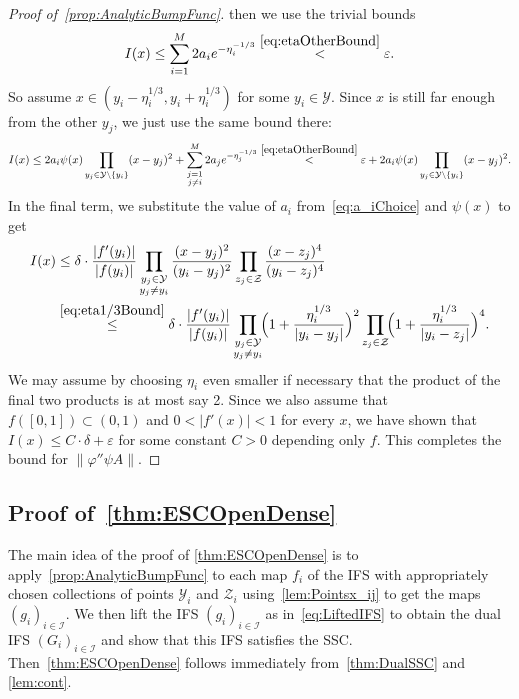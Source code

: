 \documentclass[11pt,]{article}
\def\cref#1{\ref{#1}}%
\theoremstyle{definition}
\theoremstyle{remark}
\newcommand{\0}{\mathbf{0}}
\begin{document}
\begin{proof}[Proof of~\cref{prop:AnalyticBumpFunc}]
then we use the trivial bounds
\begin{equation*}
	I(x) \leq \sum_{i=1}^{M} 2a_ie^{-\eta_i^{-1/3}} \stackrel{\eqref{eq:etaOtherBound}}{<} \varepsilon.
\end{equation*}
So assume $x\in(y_i-\eta_i^{1/3}, y_i+\eta_i^{1/3})$ for some $y_i\in\mathcal{Y}$. Since $x$ is
still far enough from the other $y_j$, we just use the same bound there:
\begin{equation*}
	I(x) \leq 2a_i \psi(x) \prod_{y_j\in\mathcal{Y}\setminus\{y_i\}} (x-y_j)^2 +
	\sum_{\substack{j=1 \\ j\neq i}}^{M} 2a_j e^{-\eta_j^{-1/3}}
	\stackrel{\eqref{eq:etaOtherBound}}{<} \varepsilon + 2a_i \psi(x)
	\prod_{y_j\in\mathcal{Y}\setminus\{y_i\}} (x-y_j)^2.
\end{equation*}
In the final term, we substitute the value of $a_i$ from~\cref{eq:a_iChoice} and $\psi(x)$ to get
\begin{align*}
	I(x)&\leq \delta \cdot \frac{|f'(y_i)|}{|f(y_i)|} \prod_{\substack{y_j\in\mathcal{Y} \\
	y_j\neq y_i}} \frac{(x-y_j)^2}{(y_i - y_j)^2}  \prod_{z_j\in\mathcal{Z}}
	\frac{(x-z_j)^4}{(y_i - z_j)^4} \\
	&\stackrel{\eqref{eq:eta1/3Bound}}{\leq}  \delta \cdot
	\frac{|f'(y_i)|}{|f(y_i)|}\prod_{\substack{y_j\in\mathcal{Y} \\ y_j\neq y_i}}\!\! \Big(
	1+\frac{\eta_i^{1/3}}{|y_i-y_j|} \Big)^2 \prod_{z_j\in\mathcal{Z}}\!\! \Big(
      1+\frac{\eta_i^{1/3}}{|y_i-z_j|} \Big)^4. 
\end{align*}
We may assume by choosing $\eta_i$ even smaller if necessary that the product of the final two
products is at most say 2. Since we also assume that $f([0,1])\subset (0,1)$ and $0<|f'(x)|<1$ for
every $x$, we have shown that $I(x)\leq C\cdot\delta+\varepsilon$ for some constant $C>0$ depending
only $f$. This completes the bound for $\| \varphi'' \psi A\|$. 
\end{proof}

\subsection{Proof of~\cref{thm:ESCOpenDense}}

The main idea of the proof of \cref{thm:ESCOpenDense} is to apply~\cref{prop:AnalyticBumpFunc} to
each map $f_i$ of the IFS with appropriately chosen collections of points $\mathcal{Y}_i$ and
$\mathcal{Z}_i$ using~\cref{lem:Pointsx_ij} to get the maps $(g_i)_{i\in\mathcal{I}}$. We then lift
the IFS $(g_i)_{i\in\mathcal{I}}$ as in~\cref{eq:LiftedIFS} to obtain the dual IFS
$(G_i)_{i\in\mathcal{I}}$ and show that this
IFS satisfies the SSC. Then~\cref{thm:ESCOpenDense} follows immediately from~\cref{thm:DualSSC} and
\cref{lem:cont}.
\end{document}

